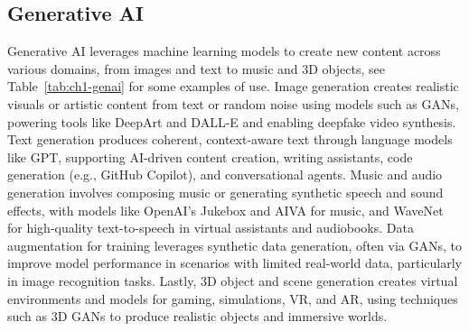 \subsection{Generative AI}
\label{sec:ch1-genai}

Generative AI leverages machine learning models to create new content across
various domains, from images and text to music and 3D objects, see Table~\ref{tab:ch1-genai}
for some examples of use. Image generation creates realistic visuals or artistic
content from text or random noise using models such as GANs, powering
tools like DeepArt and DALL-E and enabling deepfake video synthesis. Text
generation produces coherent, context-aware text through language models
like GPT, supporting AI-driven content creation, writing assistants, code generation
(e.g., GitHub Copilot), and conversational agents. Music and audio
generation involves composing music or generating synthetic speech and sound
effects, with models like OpenAI's Jukebox and AIVA for music, and WaveNet
for high-quality text-to-speech in virtual assistants and audiobooks. Data augmentation
for training leverages synthetic data generation, often via GANs, to
improve model performance in scenarios with limited real-world data, particularly
in image recognition tasks. Lastly, 3D object and scene generation creates
virtual environments and models for gaming, simulations, VR, and AR, using
techniques such as 3D GANs to produce realistic objects and immersive worlds.

